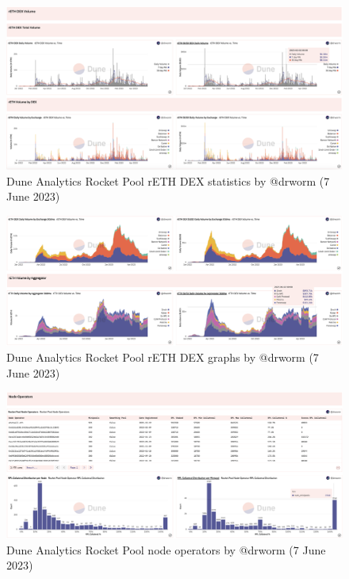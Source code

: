 \documentclass[UTF8]{article}
\begin{document}
\begin{figure}[htbp]
\begin{center}
\includegraphics[width=\linewidth]{images/rocketdrworm6}
\caption{Dune Analytics Rocket Pool rETH DEX statistics by @drworm  (7 June 2023)}
\label{fig:rocketdrworm6}
\end{center}
\end{figure}

\begin{figure}[htbp]
\begin{center}
\includegraphics[width=\linewidth]{images/rocketdrworm7}
\caption{Dune Analytics Rocket Pool rETH DEX graphs by @drworm  (7 June 2023)}
\label{fig:rocketdrworm7}
\end{center}
\end{figure}

\begin{figure}[htbp]
\begin{center}
\includegraphics[width=\linewidth]{images/rocketdrworm8}
\caption{Dune Analytics Rocket Pool node operators by @drworm  (7 June 2023)}
\label{fig:rocketdrworm8}
\end{center}
\end{figure}
\end{document}
